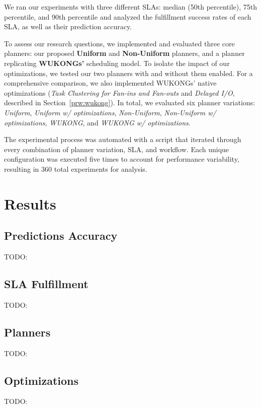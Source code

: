\documentclass[conference]{IEEEtran}
\begin{document}
We ran our experiments with three different SLAs: median (50th percentile), 75th percentile, and 90th percentile and analyzed the fulfillment success rates of each SLA, as well as their prediction accuracy.

To assess our research questions, we implemented and evaluated three core planners: our proposed \textbf{Uniform} and \textbf{Non-Uniform} planners, and a planner replicating \textbf{WUKONGs'} scheduling model. To isolate the impact of our optimizations, we tested our two planners with and without them enabled. For a comprehensive comparison, we also implemented WUKONGs' native optimizations (\textit{Task Clustering for Fan-ins and Fan-outs} and \textit{Delayed I/O}, described in Section~\ref{prw:wukong}). In total, we evaluated six planner variations: \textit{Uniform}, \textit{Uniform w/ optimizations}, \textit{Non-Uniform}, \textit{Non-Uniform w/ optimizations}, \textit{WUKONG}, and \textit{WUKONG w/ optimizations}.

The experimental process was automated with a script that iterated through every combination of planner variation, SLA, and workflow. Each unique configuration was executed five times to account for performance variability, resulting in 360 total experiments for analysis.

\section{Results}
\subsection{Predictions Accuracy}
TODO: 

\subsection{SLA Fulfillment}
TODO: 

\subsection{Planners}
TODO: 

\subsection{Optimizations}
TODO: 
\end{document}
